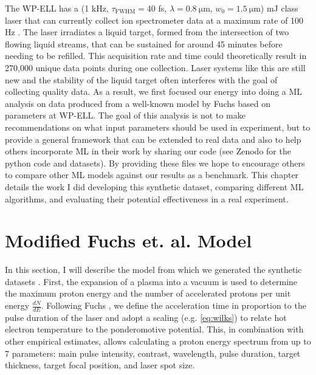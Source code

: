 The \gls{WP-ELL} has a (1 kHz, $\tau_\text{FWHM} = 40$ fs, $\lambda = \SI{0.8}{\micro \meter}$, $w_0 = \SI{1.5}{\micro \meter}$) mJ class laser that can currently collect ion spectrometer data at a maximum rate of 100 Hz \cite{George_2019_HPLSE}. The laser irradiates a liquid target, formed from the intersection of two flowing liquid streams, that can be sustained for around 45 minutes before needing to be refilled. This acquisition rate and time could theoretically result in 270,000 unique data points during one collection. Laser systems like this are still new and the stability of the liquid target often interferes with the goal of collecting quality data. As a result, we first focused our energy into doing a \gls{ML} analysis on data produced from a well-known model by Fuchs \cite{Fuchs_2005_Nat} based on parameters at \gls{WP-ELL}. The goal of this analysis is not to make recommendations on what input parameters should be used in experiment, but to provide a general framework that can be extended to real data and also to help others incorporate \gls{ML} in their work by sharing our code (see Zenodo \cite{Desai_2024_Zenodo, Desai_2025_Zenodo} for the python code and datasets). By providing these files we hope to encourage others to compare other ML models against our results as a benchmark. This chapter details the work I did developing this synthetic dataset, comparing different \gls{ML} algorithms, and evaluating their potential effectiveness in a real experiment. 

\section{Modified Fuchs et. al. Model} \label{sec:fuchs_model}

In this section, I will describe the model from which we generated the synthetic datasets \cite{Desai_2024_CPP, Desai_2025_APL}. First, the expansion of a plasma into a vacuum \cite{Mora_2003_PRL} is used to determine the maximum proton energy and the number of accelerated protons per unit energy $\frac{dN}{dE}$. Following Fuchs \cite{Fuchs_2005_Nat}, we define the acceleration time in proportion to the pulse duration of the laser and adopt a scaling (e.g. \autoref{eq:wilks}) to relate hot electron temperature to the ponderomotive potential. This, in combination with other empirical estimates, allows calculating a proton energy spectrum from up to 7 parameters: main pulse intensity, contrast, wavelength, pulse duration, target thickness, target focal position, and laser spot size.

